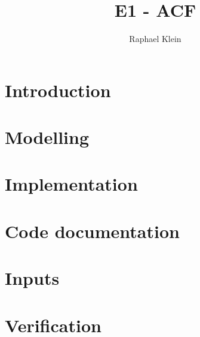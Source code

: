 \documentclass[11pt]{book}
\title{E1 - ACF}
\author{Raphael Klein}
\begin{document}
\maketitle




\tableofcontents

\chapter{Introduction}


\chapter{Modelling}


\chapter{Implementation}


\chapter{Code documentation}


\chapter{Inputs}


\chapter{Verification}

\end{document}
